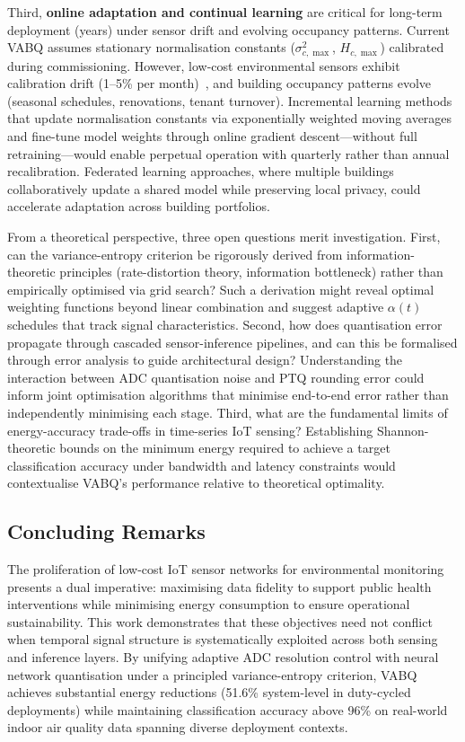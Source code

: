 Third, \textbf{online adaptation and continual learning} are critical for long-term deployment (years) under sensor drift and evolving occupancy patterns. Current VABQ assumes stationary normalisation constants ($\sigma_{c,\max}^2$, $H_{c,\max}$) calibrated during commissioning. However, low-cost environmental sensors exhibit calibration drift (1--5\% per month)~\cite{dimitriou2025innovations}, and building occupancy patterns evolve (seasonal schedules, renovations, tenant turnover). Incremental learning methods that update normalisation constants via exponentially weighted moving averages and fine-tune model weights through online gradient descent---without full retraining---would enable perpetual operation with quarterly rather than annual recalibration. Federated learning approaches, where multiple buildings collaboratively update a shared model while preserving local privacy, could accelerate adaptation across building portfolios.

From a theoretical perspective, three open questions merit investigation. First, can the variance-entropy criterion be rigorously derived from information-theoretic principles (rate-distortion theory, information bottleneck) rather than empirically optimised via grid search? Such a derivation might reveal optimal weighting functions beyond linear combination and suggest adaptive $\alpha(t)$ schedules that track signal characteristics. Second, how does quantisation error propagate through cascaded sensor-inference pipelines, and can this be formalised through error analysis to guide architectural design? Understanding the interaction between ADC quantisation noise and PTQ rounding error could inform joint optimisation algorithms that minimise end-to-end error rather than independently minimising each stage. Third, what are the fundamental limits of energy-accuracy trade-offs in time-series IoT sensing? Establishing Shannon-theoretic bounds on the minimum energy required to achieve a target classification accuracy under bandwidth and latency constraints would contextualise VABQ's performance relative to theoretical optimality.

\subsection{Concluding Remarks}
\label{sec:conc_remarks}

The proliferation of low-cost IoT sensor networks for environmental monitoring presents a dual imperative: maximising data fidelity to support public health interventions while minimising energy consumption to ensure operational sustainability. This work demonstrates that these objectives need not conflict when temporal signal structure is systematically exploited across both sensing and inference layers. By unifying adaptive ADC resolution control with neural network quantisation under a principled variance-entropy criterion, VABQ achieves substantial energy reductions (51.6\% system-level in duty-cycled deployments) while maintaining classification accuracy above 96\% on real-world indoor air quality data spanning diverse deployment contexts.

